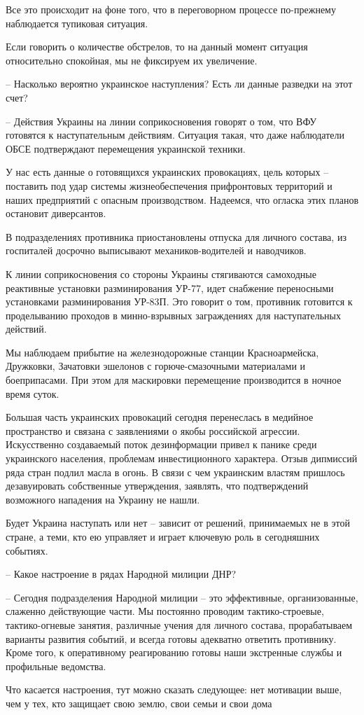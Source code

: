 Все это происходит на фоне того, что в переговорном процессе по-прежнему
наблюдается тупиковая ситуация.

Если говорить о количестве обстрелов, то на данный момент ситуация относительно
спокойная, мы не фиксируем их увеличение.

– Насколько вероятно украинское наступления? Есть ли данные разведки на этот
счет?

– Действия Украины на линии соприкосновения говорят о том, что ВФУ готовятся к
наступательным действиям. Ситуация такая, что даже наблюдатели ОБСЕ
подтверждают перемещения украинской техники.

У нас есть данные о готовящихся украинских провокациях, цель которых –
поставить под удар системы жизнеобеспечения прифронтовых территорий и наших
предприятий с опасным производством. Надеемся, что огласка этих планов
остановит диверсантов.

В подразделениях противника приостановлены отпуска для личного состава, из
госпиталей досрочно выписывают механиков-водителей и наводчиков.

К линии соприкосновения со стороны Украины стягиваются самоходные реактивные
установки разминирования УР-77, идет снабжение переносными установками
разминирования УР-83П. Это говорит о том, противник готовится к проделыванию
проходов в минно-взрывных заграждениях для наступательных действий.

Мы наблюдаем прибытие на железнодорожные станции Красноармейска, Дружковки,
Зачатовки эшелонов с горюче-смазочными материалами и боеприпасами. При этом для
маскировки перемещение производится в ночное время суток.

Большая часть украинских провокаций сегодня перенеслась в медийное пространство
и связана с заявлениями о якобы российской агрессии. Искусственно создаваемый
поток дезинформации привел к панике среди украинского населения, проблемам
инвестиционного характера. Отзыв дипмиссий ряда стран подлил масла в огонь. В
связи с чем украинским властям пришлось дезавуировать собственные утверждения,
заявлять, что подтверждений возможного нападения на Украину не нашли.

Будет Украина наступать или нет – зависит от решений, принимаемых не в этой
стране, а теми, кто ею управляет и играет ключевую роль в сегодняшних событиях.

– Какое настроение в рядах Народной милиции ДНР?

– Сегодня подразделения Народной милиции – это эффективные, организованные,
слаженно действующие части. Мы постоянно проводим тактико-строевые,
тактико-огневые занятия, различные учения для личного состава, прорабатываем
варианты развития событий, и всегда готовы адекватно ответить противнику. Кроме
того, к оперативному реагированию готовы наши экстренные службы и профильные
ведомства.

Что касается настроения, тут можно сказать следующее: нет мотивации выше, чем у
тех, кто защищает свою землю, свои семьи и свои дома
